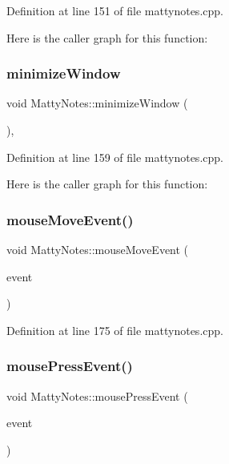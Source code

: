 Definition at line 151 of file mattynotes.\+cpp.

Here is the caller graph for this function\+:
\hypertarget{classMattyNotes_a59034e42bf605fafd6b37e513b6f85fb}{}\label{classMattyNotes_a59034e42bf605fafd6b37e513b6f85fb} 
\subsubsection{\texorpdfstring{minimize\+Window}{minimizeWindow}}
{\footnotesize\ttfamily void Matty\+Notes\+::minimize\+Window (\begin{DoxyParamCaption}{ }\end{DoxyParamCaption})\hspace{0.3cm}{\ttfamily [private]}, {\ttfamily [slot]}}



Definition at line 159 of file mattynotes.\+cpp.

Here is the caller graph for this function\+:
\hypertarget{classMattyNotes_a0b9d1b50929a097d705e211b57fb12d0}{}\label{classMattyNotes_a0b9d1b50929a097d705e211b57fb12d0} 
\subsubsection{\texorpdfstring{mouse\+Move\+Event()}{mouseMoveEvent()}}
{\footnotesize\ttfamily void Matty\+Notes\+::mouse\+Move\+Event (\begin{DoxyParamCaption}\item[{Q\+Mouse\+Event $\ast$}]{event }\end{DoxyParamCaption})\hspace{0.3cm}{\ttfamily [private]}}



Definition at line 175 of file mattynotes.\+cpp.

\hypertarget{classMattyNotes_a4818a8cc2dbd824bc005034cb2656198}{}\label{classMattyNotes_a4818a8cc2dbd824bc005034cb2656198} 
\subsubsection{\texorpdfstring{mouse\+Press\+Event()}{mousePressEvent()}}
{\footnotesize\ttfamily void Matty\+Notes\+::mouse\+Press\+Event (\begin{DoxyParamCaption}\item[{Q\+Mouse\+Event $\ast$}]{event }\end{DoxyParamCaption})\hspace{0.3cm}{\ttfamily [private]}}



